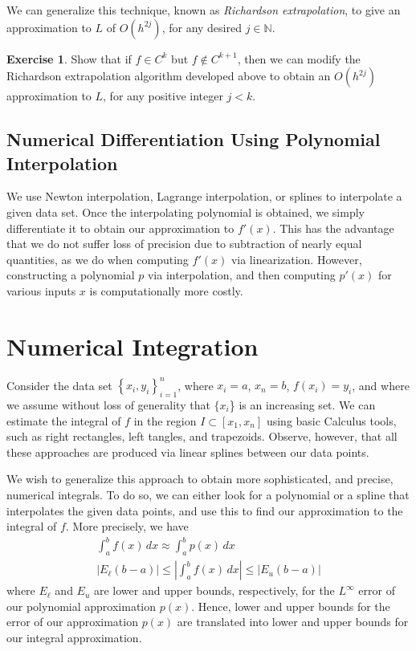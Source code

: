 \documentclass[12pt]{article}
\theoremstyle{plain}
\theoremstyle{definition}
\newtheorem*{exercise}{Exercise}
\theoremstyle{remark}
\numberwithin{equation}{section}  %
\begin{document}
We can generalize this technique, known as \emph{Richardson extrapolation},
to give an approximation to $L$ of
$O(h^{2j})$, for any desired $j \in \mathbb{N}$. 
\begin{exercise}
Show that if $f \in C^k$ but $f \not \in C^{k+1}$, then we can modify
the Richardson extrapolation algorithm developed above to obtain an 
$O(h^{2j})$ approximation to $L$, for any positive integer $j < k$.
\end{exercise}
\subsection{Numerical Differentiation Using Polynomial Interpolation}
We use Newton interpolation, Lagrange interpolation, or splines to interpolate a
given data set. Once the interpolating polynomial is obtained, we simply differentiate it
to obtain our approximation to $f'(x)$. This has the advantage
that we do not suffer loss of precision due to subtraction of nearly equal
quantities, as we do when computing $f'(x)$ via linearization. However,
constructing a polynomial $p$ via interpolation, and then computing $p'(x)$
for various inputs $x$ is computationally more costly. 
\section{Numerical Integration}
Consider the data set $ \left\{ x_i, y_i \right\}_{i=1}^{n}$, where $x_i = a$,
$x_n = b$, $f(x_i) = y_i$,
and where we assume without loss of generality that $\{x_i$\} is an
increasing set. We can estimate the integral of $f$ in the region $I \subset [x_1, x_n]$
using basic Calculus tools, such as right rectangles, left tangles, and trapezoids.
Observe, however, that all these approaches are produced via linear splines
between our data points. 

We wish to generalize this approach to obtain more sophisticated, and precise,
numerical integrals. To do so, we can either look for a polynomial or a spline
that interpolates the given data points, and use this to find our approximation
to the integral of $f$. More precisely, we have 
\begin{align*}
\int_a^b f(x)\, dx \approx \int_a^b p(x)\, dx
\\
|E_\ell(b-a)| \le | \int_a^b f(x) \, dx| \le |E_u (b-a)|
\end{align*}
where $E_\ell$ and $E_u$ are lower and upper bounds, respectively, for the $L^\infty$
error of our polynomial approximation $p(x)$. Hence, lower and upper bounds for the error of our approximation $p(x)$
are translated into lower and upper bounds for our integral approximation.
\end{document}
